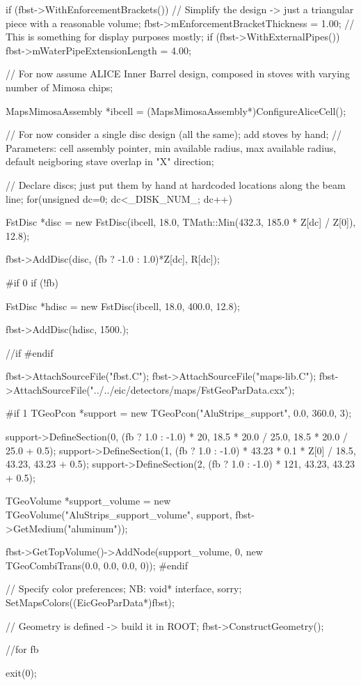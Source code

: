 \documentclass[12pt]{article}
\begin{document}
\begin{tcolorbox}
\begin{verbnobox}[\tiny]
{{    if (fbst->WithEnforcementBrackets()) // Simplify the design -> just a triangular piece with a reasonable volume; 
      fbst->mEnforcementBracketThickness   =    1.00;
    // This is something for display purposes mostly;
    if (fbst->WithExternalPipes())
      fbst->mWaterPipeExtensionLength      =    4.00;

    //  For now assume ALICE Inner Barrel design, composed in stoves with varying number of Mimosa chips;

    MapsMimosaAssembly *ibcell = (MapsMimosaAssembly*)ConfigureAliceCell();

    // For now consider a single disc design (all the same); add stoves by hand;
    // Parameters: cell assembly pointer, min available radius, max available radius, default neigboring stave overlap in "X" direction;

    // Declare discs; just put them by hand at hardcoded locations along the beam line;
    for(unsigned dc=0; dc<_DISK_NUM_; dc++) {
      FstDisc *disc = new FstDisc(ibcell, 18.0, TMath::Min(432.3, 185.0 * Z[dc] / Z[0]), 12.8);

      fbst->AddDisc(disc, (fb ? -1.0 : 1.0)*Z[dc], R[dc]);
    }
#if 0
    if (!fb) {
      FstDisc *hdisc = new FstDisc(ibcell, 18.0, 400.0, 12.8);

      fbst->AddDisc(hdisc, 1500.);
    } //if
#endif

    fbst->AttachSourceFile("fbst.C");
    fbst->AttachSourceFile("maps-lib.C");
    fbst->AttachSourceFile("../../eic/detectors/maps/FstGeoParData.cxx");

#if 1
    TGeoPcon *support = new TGeoPcon("AluStrips_support", 0.0, 360.0, 3);

    support->DefineSection(0, (fb ? 1.0 : -1.0) * 20, 18.5 * 20.0 / 25.0, 18.5 * 20.0 / 25.0 + 0.5);
    support->DefineSection(1, (fb ? 1.0 : -1.0) * 43.23 * 0.1 * Z[0] / 18.5, 43.23, 43.23 + 0.5);
    support->DefineSection(2, (fb ? 1.0 : -1.0) * 121, 43.23, 43.23 + 0.5);

    TGeoVolume *support_volume = new TGeoVolume("AluStrips_support_volume", support, fbst->GetMedium("aluminum"));

    fbst->GetTopVolume()->AddNode(support_volume, 0, new TGeoCombiTrans(0.0, 0.0, 0.0, 0));
#endif

    // Specify color preferences; NB: void* interface, sorry;
    SetMapsColors((EicGeoParData*)fbst);

    // Geometry is defined -> build it in ROOT;
    fbst->ConstructGeometry();
  } //for fb
  
  exit(0);
}
\end{verbnobox}  
\end{tcolorbox}


%
%
\end{document}
